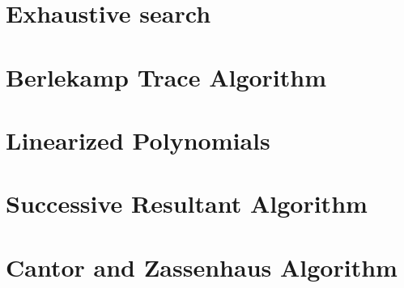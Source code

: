 \section{Exhaustive search}
\section{Berlekamp Trace Algorithm}
\section{Linearized Polynomials}
\section{Successive Resultant Algorithm}
\section{Cantor and Zassenhaus Algorithm}
